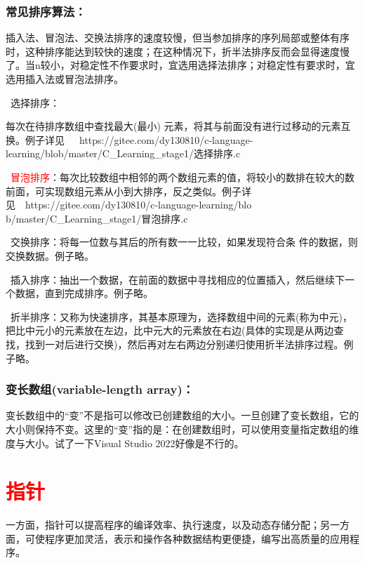 \documentclass[zihao=-4,UTF8]{report}
\begin{document}
\subsubsection{常见排序算法：}
插入法、冒泡法、交换法排序的速度较慢，但当参加排序的序列局部或整体有序时，这种排序能达到较快的速度；在这种情况下，折半法排序反而会显得速度慢了。当n较小，对稳定性不作要求时，宜选用选择法排序；对稳定性有要求时，宜选用插入法或冒泡法排序。\par
{}\ 选择排序：\par
每次在待排序数组中查找最大(最小)
元素，将其与前面没有进行过移动的元素互换。{\color{gray}\small 例子详见\ \ \ https://gitee.com/dy130810/c-language-learning/blob/master/C\_Learning\_stage1/选择排序.c}\par
{}\ \textcolor{red}{冒泡排序}：每次比较数组中相邻的两个数组元素的值，将较小的数排在较大的数前面，可实现数组元素从小到大排序，反之类似。{\color{gray}\small 例子详见\ \ https://gitee.com/dy130810/c-language-learning/blo \\ b/master/C\_Learning\_stage1/冒泡排序.c}\par
{}\ 交换排序：将每一位数与其后的所有数一一比较，如果发现符合条
件的数据，则交换数据。{\color{gray}\small 例子略。}\par
{}\ 插入排序：抽出一个数据，在前面的数据中寻找相应的位置插入，然后继续下一个数据，直到完成排序。{\color{gray}\small 例子略。}\par
{}\ 折半排序：又称为快速排序，其基本原理为，选择数组中间的元素(称为中元)，把比中元小的元素放在左边，比中元大的元素放在右边(具体的实现是从两边查找，找到一对后进行交换)，然后再对左右两边分别递归使用折半法排序过程。{\color{gray}\small 例子略。}\par
\subsubsection{变长数组(variable-length array)：}
变长数组中的“变”不是指可以修改已创建数组的大小。一旦创建了变长数组，它的大小则保持不变。这里的“变”指的是：在创建数组时，可以使用变量指定数组的维度与大小。{\color{gray}\small 试了一下Visual Studio 2022好像是不行的。}


\section{\textcolor{red}{指针}}
一方面，指针可以提高程序的编译效率、执行速度，以及动态存储分配；另一方面，可使程序更加灵活，表示和操作各种数据结构更便捷，编写出高质量的应用程序。
\end{document}
